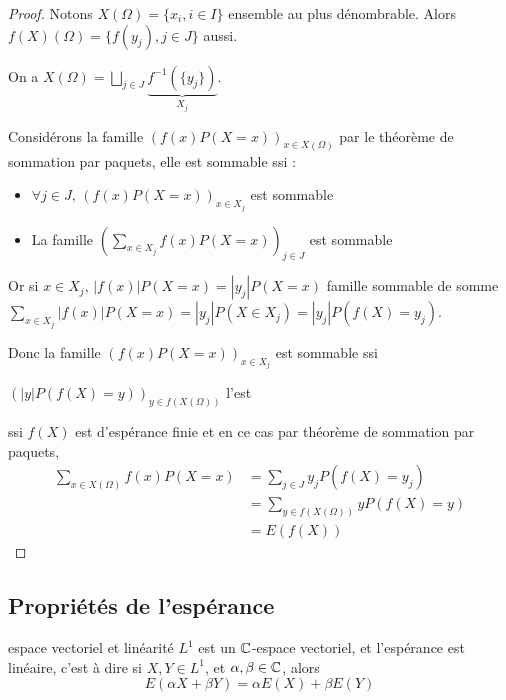 \begin{proof}
    Notons $X(\Omega) = \{x_i, i \in I\}$ ensemble au plus dénombrable. Alors 
    $f(X)(\Omega) = \{f(y_j), j \in J\}$ aussi.

    On a $X(\Omega) = \bigsqcup_{j \in J} \underbrace{f^{-1}(\{y_j\})}_{X_j}$.

    Considérons la famille $(f(x) P(X = x))_{x \in X(\Omega)}$ par le théorème de sommation 
    par paquets, elle est sommable ssi : 
    \begin{itemize}
        \item $\forall j \in J, \, (f(x) P(X = x))_{x \in X_j}$ est sommable
        \item La famille $\displaystyle \left(\sum_{x \in X_j} f(x) P(X = x)\right)_{j \in J}$ est sommable
    \end{itemize}

    Or si $x \in X_j$, $|f(x)| P(X = x) = |y_j| P(X = x)$ famille sommable 
    de somme $\displaystyle \sum_{x \in X_j} |f(x)| P(X = x) = |y_j| P(X \in X_j) = |y_j| P(f(X) = y_j)$.

    Donc la famille $(f(x) P(X = x))_{x \in X_j}$ est sommable ssi 

    $(|y| P(f(X) = y))_{y \in f(X(\Omega))}$ l'est 

    ssi $f(X)$ est d'espérance finie
    et en ce cas par théorème de sommation par paquets,
    \begin{align}
        \sum_{x \in X(\Omega)} f(x) P(X = x) & = \sum_{j \in J} y_j P(f(X) = y_j) \\
        & = \sum_{y \in f(X(\Omega))} y P(f(X) = y) \\
        & = E(f(X))
    \end{align}
\end{proof}

\subsection{Propriétés de l'espérance}

\begin{proposition}{espace vectoriel et linéarité}{}
    $L^1$ est un $\mathbb{C}$-espace vectoriel, et l'espérance est linéaire, c'est à dire si 
    $X, Y \in L^1$, et $\alpha, \beta \in \mathbb{C}$, alors
    $$ E(\alpha X + \beta Y) = \alpha E(X) + \beta E(Y) $$
\end{proposition}


